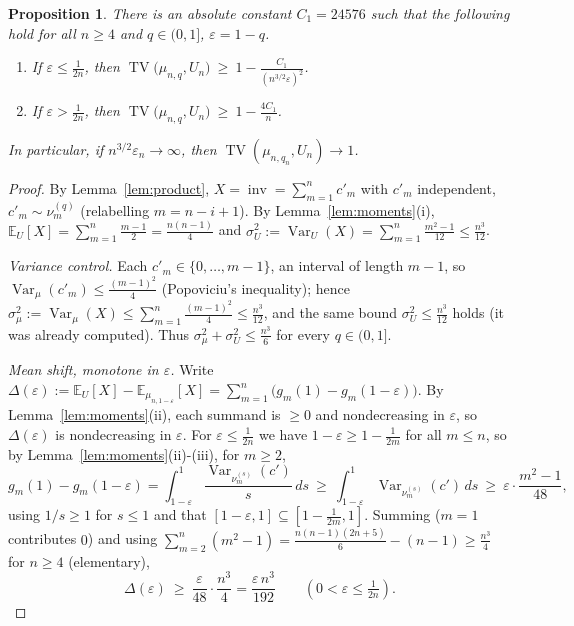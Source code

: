 \documentclass[12pt]{article}
\newtheorem{proposition}{Proposition}
\theoremstyle{definition}
\DeclareMathOperator{\inv}{inv}
\DeclareMathOperator{\TV}{TV}
\DeclareMathOperator{\Var}{Var}
\newcommand{\E}{\mathbb{E}}
\newcommand{\eps}{\varepsilon}
\begin{document}
\begin{proposition}\label{prop:TVlower}
There is an absolute constant $C_1=24576$ such that the following hold for all $n\ge4$
and $q\in(0,1]$, $\eps=1-q$.
\begin{enumerate}
\item[(a)] If $\eps\le\tfrac1{2n}$, then
$\displaystyle \TV\big(\mu_{n,q},U_n\big)\ \ge\ 1-\frac{C_1}{(n^{3/2}\eps)^2}$.
\item[(b)] If $\eps>\tfrac1{2n}$, then
$\displaystyle \TV\big(\mu_{n,q},U_n\big)\ \ge\ 1-\frac{4C_1}{n}$.
\end{enumerate}
In particular, if $n^{3/2}\eps_n\to\infty$, then $\TV(\mu_{n,q_n},U_n)\to1$.
\end{proposition}

\begin{proof}
By Lemma~\ref{lem:product}, $X=\inv=\sum_{m=1}^n c'_m$ with $c'_m$ independent,
$c'_m\sim\nu^{(q)}_m$ (relabelling $m=n-i+1$). By Lemma~\ref{lem:moments}(i),
$\E_U[X]=\sum_{m=1}^n\tfrac{m-1}{2}=\tfrac{n(n-1)}{4}$ and
$\sigma_U^2:=\Var_U(X)=\sum_{m=1}^n\tfrac{m^2-1}{12}\le\tfrac{n^3}{12}$.

\emph{Variance control.} Each $c'_m\in\{0,\dots,m-1\}$, an interval of length $m-1$,
so $\Var_\mu(c'_m)\le\tfrac{(m-1)^2}{4}$ (Popoviciu's inequality); hence
$\sigma_\mu^2:=\Var_\mu(X)\le\sum_{m=1}^n\tfrac{(m-1)^2}{4}\le\tfrac{n^3}{12}$, and the
same bound $\sigma_U^2\le\tfrac{n^3}{12}$ holds (it was already computed). Thus
$\sigma_\mu^2+\sigma_U^2\le\tfrac{n^3}{6}$ for every $q\in(0,1]$.

\emph{Mean shift, monotone in $\eps$.} Write $\Delta(\eps):=\E_U[X]-\E_{\mu_{n,1-\eps}}[X]
=\sum_{m=1}^n\big(g_m(1)-g_m(1-\eps)\big)$. By Lemma~\ref{lem:moments}(ii), each summand
is $\ge0$ and nondecreasing in $\eps$, so $\Delta(\eps)$ is nondecreasing in $\eps$.
For $\eps\le\tfrac1{2n}$ we have $1-\eps\ge1-\tfrac1{2m}$ for all $m\le n$, so by
Lemma~\ref{lem:moments}(ii)-(iii), for $m\ge2$,
\[
g_m(1)-g_m(1-\eps)=\int_{1-\eps}^1\frac{\Var_{\nu^{(s)}_m}(c')}{s}\,ds
\ \ge\ \int_{1-\eps}^1\Var_{\nu^{(s)}_m}(c')\,ds\ \ge\ \eps\cdot\frac{m^2-1}{48},
\]
using $1/s\ge1$ for $s\le1$ and that $[1-\eps,1]\subseteq[1-\tfrac1{2m},1]$. Summing
($m=1$ contributes $0$) and using
$\sum_{m=2}^n(m^2-1)=\tfrac{n(n-1)(2n+5)}{6}-(n-1)\ge\tfrac{n^3}{4}$ for $n\ge4$
(elementary),
\begin{equation}\label{eq:Deltalb}
\Delta(\eps)\ \ge\ \frac{\eps}{48}\cdot\frac{n^3}{4}=\frac{\eps\,n^3}{192}
\qquad(0<\eps\le\tfrac1{2n}).
\end{equation}


\end{proof}
\end{document}
